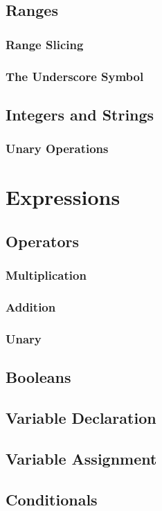 \documentclass[titlepage]{article}
\begin{document}
\subsection{Ranges}
\subsubsection{Range Slicing}
\subsubsection{The Underscore Symbol}
\subsection{Integers and Strings}
\subsubsection{Unary Operations}
\section{Expressions}
\subsection{Operators}
\subsubsection{Multiplication}
\subsubsection{Addition}
\subsubsection{Unary}
\subsection{Booleans}
\subsection{Variable Declaration}
\subsection{Variable Assignment}
\subsection{Conditionals}
\end{document}
